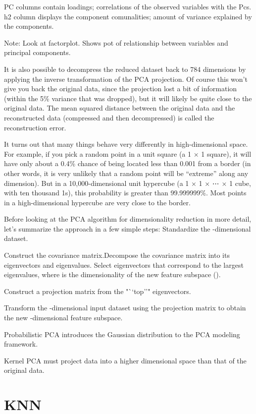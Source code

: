 \documentclass[]{book}
\begin{document}
PC columns contain loadings; correlations of the observed variables with the Pcs. h2 column displays the component comunalities; amount of variance explained by the components.

Note: Look at factorplot. Shows pot of relationship between variables and principal components.

It is also possible to decompress the reduced dataset back to 784 dimensions by applying the inverse transformation of the PCA projection. Of course this won't give you back the original data, since the projection lost a bit of information (within the 5\% variance that was dropped), but it will likely be quite close to the original data. The mean squared distance between the original data and the reconstructed data (compressed and then decompressed) is called the reconstruction error.

It turns out that many things behave very differently in high-dimensional space. For example, if you pick a random point in a unit square (a 1 × 1 square), it will have only about a 0.4\% chance of being located less than 0.001 from a border (in other words, it is very unlikely that a random point will be ``extreme'' along any dimension). But in a 10,000-dimensional unit hypercube (a 1 × 1 × ⋯ × 1 cube, with ten thousand 1s), this probability is greater than 99.999999\%. Most points in a high-dimensional hypercube are very close to the border.

Before looking at the PCA algorithm for dimensionality reduction in more detail, let's summarize the approach in a few simple steps:
Standardize the -dimensional dataset.

Construct the covariance matrix.Decompose the covariance matrix into its eigenvectors and eigenvalues.
Select eigenvectors that correspond to the largest eigenvalues, where is the dimensionality of the new feature subspace ().

Construct a projection matrix from the "``top''" eigenvectors.

Transform the -dimensional input dataset using the projection matrix to obtain the new -dimensional feature subspace.

Probabilistic PCA introduces the Gaussian distribution to the PCA modeling framework.

Kernel PCA must project data into a higher dimensional space than that of the original data.

\hypertarget{knn}{%
\section{KNN}\label{knn}}
\end{document}
